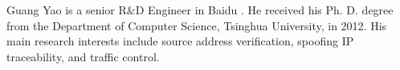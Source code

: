 \documentclass[10pt,journal,compsoc]{IEEEtran}
\begin{document}
\begin{IEEEbiography}
{Guang Yao} is a senior R\&D Engineer in Baidu . He received his Ph. D. degree from the Department of Computer Science, Tsinghua University, in 2012. His main research interests include source address verification, spoofing IP traceability, and traffic control.
\end{IEEEbiography}

\end{document}

